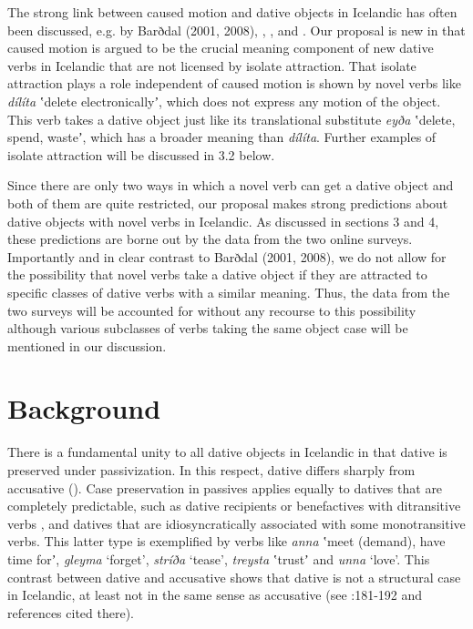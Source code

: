 \documentclass[output=paper,modfonts,nonflat,colorlinks,citecolor=brown]{langsci/langscibook}
\begin{document}
The strong link between caused motion and dative objects in Icelandic has often been discussed, e.g. by Barðdal (2001, 2008), \citet{Svenonius2002}, \citet{Maling2002}, and \citet{Jónsson2013a}. Our proposal is new in that caused motion is argued to be the crucial meaning component of new dative verbs in Icelandic that are not licensed by isolate attraction. That isolate attraction plays a role independent of caused motion is shown by novel verbs like \textit{dílíta} ʽdelete electronicallyʼ, which does not express any motion of the object. This verb takes a dative object just like its translational substitute \textit{eyða} ʽdelete, spend, wasteʼ, which has a broader meaning than \textit{dílíta}. Further examples of isolate attraction will be discussed in 3.2 below.

Since there are only two ways in which a novel verb can get a dative object and both of them are quite restricted, our proposal makes strong predictions about dative objects with novel verbs in Icelandic. As discussed in sections 3 and 4, these predictions are borne out by the data from the two online surveys. Importantly and in clear contrast to Barðdal (2001, 2008), we do not allow for the possibility that novel verbs take a dative object if they are attracted to specific classes of dative verbs with a similar meaning. Thus, the data from the two surveys will be accounted for without any recourse to this possibility although various subclasses of verbs taking the same object case will be mentioned in our discussion.

\section{Background} %

There is a fundamental unity to all dative objects in Icelandic in that dative is preserved under passivization. In this respect, dative differs sharply from accusative (\citealt{ZaenenMalingThráinsson1985}). Case preservation in passives applies equally to datives that are completely predictable, such as dative recipients or benefactives with ditransitive verbs \citep{Jónsson2000}, and datives that are idiosyncratically associated with some monotransitive verbs. This latter type is exemplified by verbs like \textit{anna} ʽmeet (demand), have time forʼ, \textit{gleyma} ‘forget’, \textit{stríða} ‘tease’, \textit{treysta} ʽtrustʼ and \textit{unna} ‘love’. This contrast between dative and accusative shows that dative is not a structural case in Icelandic, at least not in the same sense as accusative (see \citealt{Thráinsson2007}:181-192 and references cited there).
\end{document}
